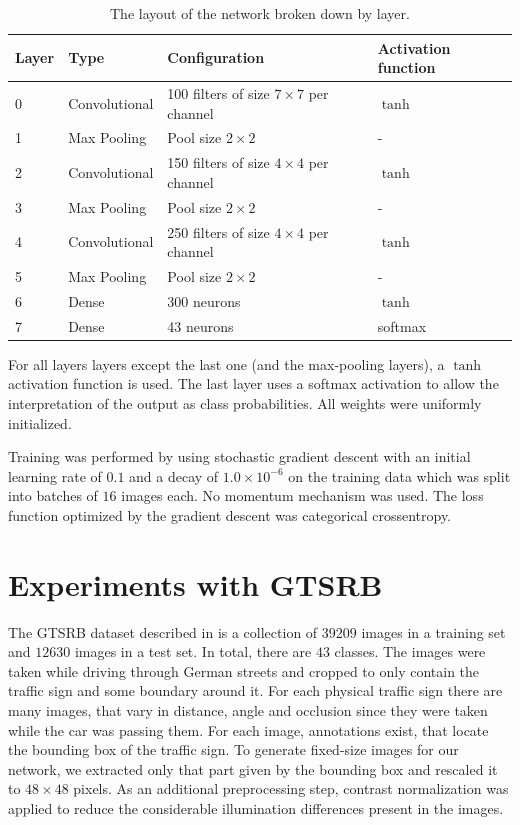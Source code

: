 \documentclass[11pt, a4paper]{article}
\begin{document}
\begin{table}[h!!!]
	\begin{tabular}{llll}
		Layer & Type & Configuration & Activation function \\
		\hline
		0 & Convolutional & 100 filters of size $7\times7$ per channel & $\tanh$ \\
		1 & Max Pooling & Pool size $2\times2$ & - \\
		2 & Convolutional & 150 filters of size $4\times4$ per channel & $\tanh$ \\
		3 & Max Pooling & Pool size $2\times2$ & - \\
		4 & Convolutional & 250 filters of size $4\times4$ per channel & $\tanh$ \\
		5 & Max Pooling & Pool size $2\times2$ & - \\
		6 & Dense & 300 neurons & $\tanh$ \\
		7 & Dense & 43 neurons & softmax
	\end{tabular}
	\caption{The layout of the network broken down by layer.}
	\label{tab:network-layout}
\end{table}

For all layers layers except the last one (and the max-pooling layers), a $\tanh$ activation function is used. The last layer uses a softmax activation to allow the interpretation of the output as class probabilities. All weights were uniformly initialized.

Training was performed by using stochastic gradient descent with an initial learning rate of $0.1$ and a decay of $1.0\times10^{-6}$ on the training data which was split into batches of $16$ images each. No momentum mechanism was used. The loss function optimized by the gradient descent was categorical crossentropy.

\section{Experiments with GTSRB}
The GTSRB dataset described in \cite{gtsrb} is a collection of $39209$ images in a training set and $12630$ images in a test set. In total, there are $43$ classes. The images were taken while driving through German streets and cropped to only contain the traffic sign and some boundary around it. For each physical traffic sign there are many images, that vary in distance, angle and occlusion since they were taken while the car was passing them. For each image, annotations exist, that locate the bounding box of the traffic sign. To generate fixed-size images for our network, we extracted only that part given by the bounding box and rescaled it to $48\times48$ pixels. As an additional preprocessing step, contrast normalization was applied to reduce the considerable illumination differences present in the images.
\end{document}
